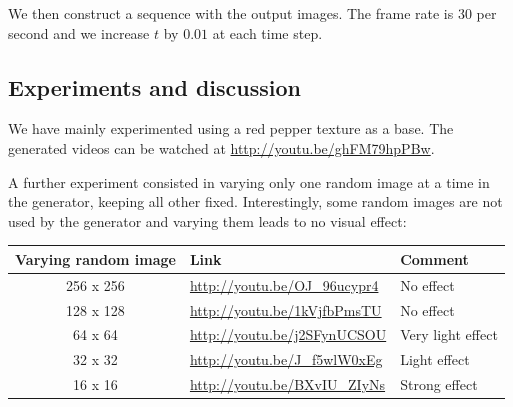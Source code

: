 \documentclass{article}
\begin{document}
We then construct a sequence with the output images. The frame rate is 30 per second and we increase $t$ by $0.01$ at each time step.

\subsection{Experiments and discussion}

We have mainly experimented using a red pepper texture as a base. The generated videos can be watched at \url{http://youtu.be/ghFM79hpPBw}. 

A further experiment consisted in varying only one random image at a time in the generator, keeping all other fixed. Interestingly, some random images are not used by the generator and varying them leads to no visual effect:

\begin{center}
  \begin{tabular}{  c | l | l }
  Varying random image & Link & Comment\\
    \hline
    256 x 256 & \url{http://youtu.be/OJ_96ucypr4} & No effect\\ 
    128 x 128 & \url{http://youtu.be/1kVjfbPmsTU} & No effect\\ 
    64 x 64 & \url{http://youtu.be/j2SFynUCSOU} & Very light effect \\
    32 x 32 & \url{http://youtu.be/J_f5wlW0xEg} & Light effect\\
    16 x 16 & \url{http://youtu.be/BXvIU_ZIyNs} & Strong effect\\
  \end{tabular}
\end{center}




\end{document}
